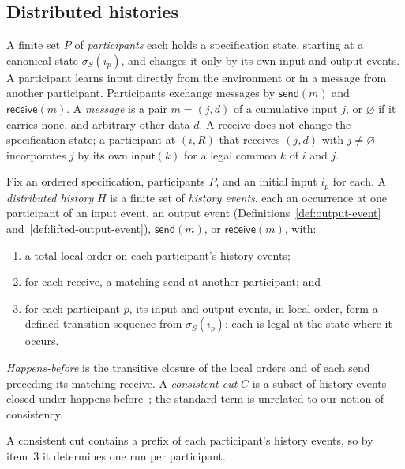 
\subsection{Distributed histories}
\label{sec:histories}

A finite set $P$ of \emph{participants} each holds a specification state,
starting at a canonical state $\sigma_S(i_p)$, and changes it only by its own
input and output events.  A participant learns input directly from the
environment or in a message from another participant.  Participants exchange
messages by $\mathsf{send}(m)$ and $\mathsf{receive}(m)$.  A
\emph{message} is a pair $m=(j,d)$ of a cumulative input $j$, or $\varnothing$
if it carries none, and arbitrary other data $d$.  A receive does not change
the specification state; a participant at $(i,R)$ that receives $(j,d)$ with
$j\neq\varnothing$ incorporates $j$ by its own $\mathsf{input}(k)$ for a legal
common \indesc $k$ of $i$ and $j$.

\begin{definition}
\label{def:distributed-history}
Fix an ordered specification, participants $P$, and an initial input $i_p$
for each.  A \emph{distributed history} $H$ is a finite set of
\emph{history events}, each an occurrence at one participant of an input
event, an output event (Definitions~\ref{def:output-event}
and~\ref{def:lifted-output-event}),
$\mathsf{send}(m)$, or $\mathsf{receive}(m)$, with:
\begin{enumerate}
  \item a total local order on each participant's history events;
  \item for each receive, a matching send at another participant; and
  \item for each participant $p$, its input and output events, in local
        order, form a defined transition sequence from $\sigma_S(i_p)$: each
        is legal at the state where it occurs.
\end{enumerate}
\emph{Happens-before} is the transitive closure of the local orders and of
each send preceding its matching receive.  A \emph{consistent cut} $C$ is a
subset of history events closed under
happens-before~\cite{lamport1978time,chandy1985distributed}; the standard term
is unrelated to our notion of consistency.
\end{definition}

A consistent cut contains a prefix of each participant's history events, so by
item~3
it determines one run per participant.

